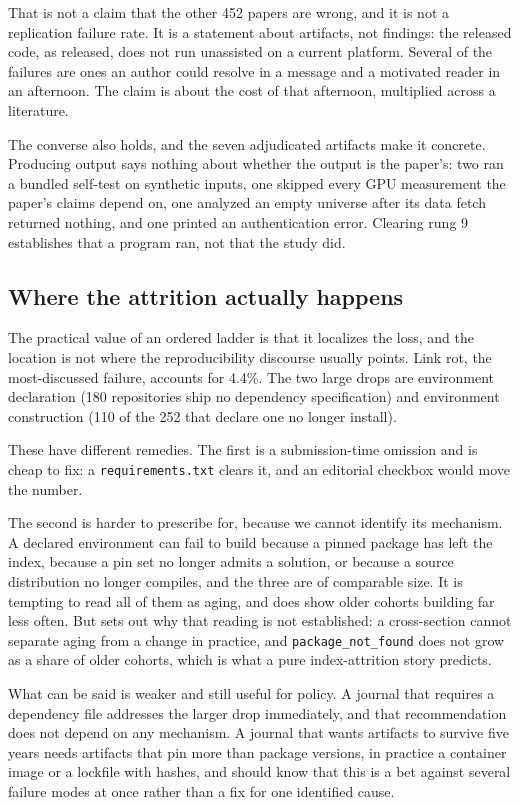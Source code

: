That is not a claim that the other 452 papers are wrong, and it is not a
replication failure rate. It is a statement about artifacts, not findings: the
released code, as released, does not run unassisted on a current platform.
Several of the failures are ones an author could resolve in a message and a
motivated reader in an afternoon. The claim is about the cost of that
afternoon, multiplied across a literature.

The converse also holds, and the seven adjudicated artifacts make it concrete.
Producing output says nothing about whether the output is the paper's: two ran a
bundled self-test on synthetic inputs, one skipped every GPU measurement the
paper's claims depend on, one analyzed an empty universe after its data fetch
returned nothing, and one printed an authentication error. Clearing rung 9
establishes that a program ran, not that the study did.

\subsection{Where the attrition actually happens}\label{sec:where}

The practical value of an ordered ladder is that it localizes the loss, and the
location is not where the reproducibility discourse usually points. Link rot,
the most-discussed failure, accounts for 4.4\%. The two large drops are
environment declaration (180 repositories ship no dependency specification) and
environment construction (110 of the 252 that declare one no longer install).

These have different remedies. The first is a submission-time omission and is
cheap to fix: a \texttt{requirements.txt} clears it, and an editorial checkbox
would move the number.

The second is harder to prescribe for, because we cannot identify its mechanism.
A declared environment can fail to build because a pinned package has left the
index, because a pin set no longer admits a solution, or because a source
distribution no longer compiles, and the three are of comparable size. It is
tempting to read all of them as aging, and  does show older
cohorts building far less often. But  sets out why that
reading is not established: a cross-section cannot separate aging from a change
in practice, and \texttt{package\_not\_found} does not grow as a share of older
cohorts, which is what a pure index-attrition story predicts.

What can be said is weaker and still useful for policy. A journal that requires a
dependency file addresses the larger drop immediately, and that recommendation
does not depend on any mechanism. A journal that wants artifacts to survive five
years needs artifacts that pin more than package versions, in practice a
container image or a lockfile with hashes, and should know that this is a bet
against several failure modes at once rather than a fix for one identified
cause.

